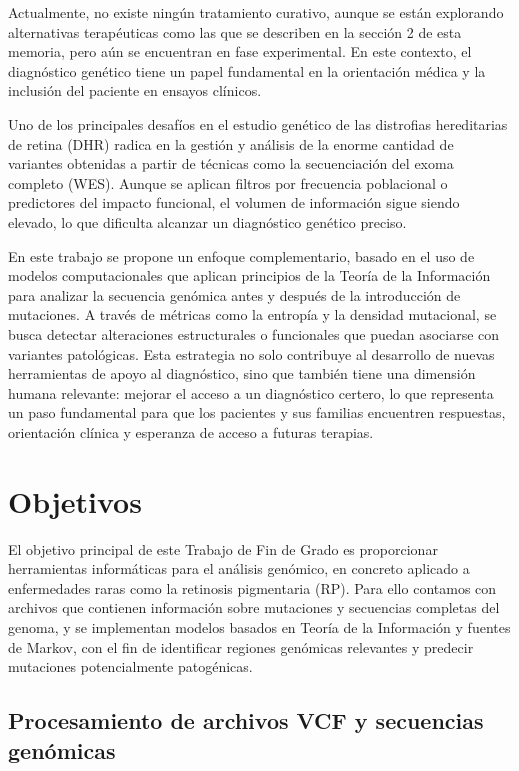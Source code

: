 \documentclass[11pt,spanish,listoffigures,listoftables]{tfgetsinf}
\begin{document}
Actualmente, no existe ningún tratamiento curativo, aunque se están explorando alternativas terapéuticas como las que se describen en la sección 2 de esta memoria, pero aún se encuentran en fase experimental. En este contexto, el diagnóstico genético tiene un papel fundamental en la orientación médica y la inclusión del paciente en ensayos clínicos\cite{HAN}.

Uno de los principales desafíos en el estudio genético de las distrofias hereditarias de retina (\acs{DHR}) radica en la gestión y análisis de la enorme cantidad de variantes obtenidas a partir de técnicas como la secuenciación del exoma completo (\acs{WES}). Aunque se aplican filtros por frecuencia poblacional o predictores del impacto funcional, el volumen de información sigue siendo elevado, lo que dificulta alcanzar un diagnóstico genético preciso\cite{DEC}.

En este trabajo se propone un enfoque complementario, basado en el uso de modelos computacionales que aplican principios de la Teoría de la Información para analizar la secuencia genómica antes y después de la introducción de mutaciones. A través de métricas como la entropía y la densidad mutacional, se busca detectar alteraciones estructurales o funcionales que puedan asociarse con variantes patológicas. Esta estrategia no solo contribuye al desarrollo de nuevas herramientas de apoyo al diagnóstico, sino que también tiene una dimensión humana relevante: mejorar el acceso a un diagnóstico certero, lo que representa un paso fundamental para que los pacientes y sus familias encuentren respuestas, orientación clínica y esperanza de acceso a futuras terapias. 

\section{Objetivos}

El objetivo principal de este Trabajo de Fin de Grado es proporcionar herramientas informáticas para el análisis genómico, en concreto aplicado a enfermedades raras como la retinosis pigmentaria (\acs{RP}). Para ello contamos con archivos que contienen información sobre mutaciones y secuencias completas del genoma, y se implementan modelos basados en Teoría de la Información y fuentes de Markov, con el fin de identificar regiones genómicas relevantes y predecir mutaciones potencialmente patogénicas.

\subsection{Procesamiento de archivos \acs{VCF} y secuencias genómicas}
\end{document}
